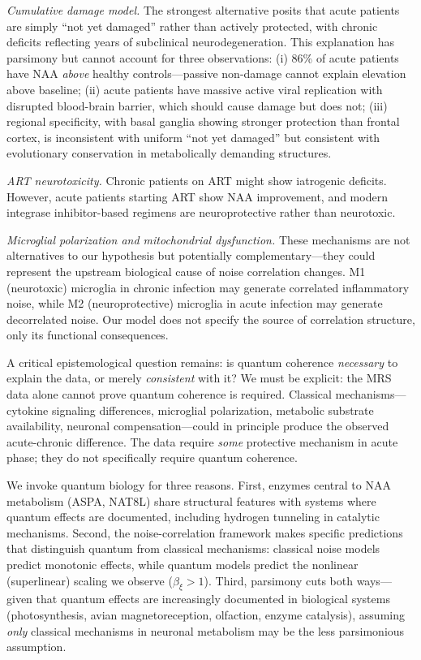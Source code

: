 \documentclass[10pt,a4paper]{article}
\begin{document}
\textit{Cumulative damage model.} The strongest alternative posits that acute patients are simply ``not yet damaged'' rather than actively protected, with chronic deficits reflecting years of subclinical neurodegeneration. This explanation has parsimony but cannot account for three observations: (i) 86\% of acute patients have NAA \textit{above} healthy controls---passive non-damage cannot explain elevation above baseline; (ii) acute patients have massive active viral replication with disrupted blood-brain barrier, which should cause damage but does not; (iii) regional specificity, with basal ganglia showing stronger protection than frontal cortex, is inconsistent with uniform ``not yet damaged'' but consistent with evolutionary conservation in metabolically demanding structures.

\textit{ART neurotoxicity.} Chronic patients on ART might show iatrogenic deficits. However, acute patients starting ART show NAA improvement, and modern integrase inhibitor-based regimens are neuroprotective rather than neurotoxic.

\textit{Microglial polarization and mitochondrial dysfunction.} These mechanisms are not alternatives to our hypothesis but potentially complementary---they could represent the upstream biological cause of noise correlation changes. M1 (neurotoxic) microglia in chronic infection may generate correlated inflammatory noise, while M2 (neuroprotective) microglia in acute infection may generate decorrelated noise. Our model does not specify the source of correlation structure, only its functional consequences.

A critical epistemological question remains: is quantum coherence \textit{necessary} to explain the data, or merely \textit{consistent} with it? We must be explicit: the MRS data alone cannot prove quantum coherence is required. Classical mechanisms---cytokine signaling differences, microglial polarization, metabolic substrate availability, neuronal compensation---could in principle produce the observed acute-chronic difference. The data require \textit{some} protective mechanism in acute phase; they do not specifically require quantum coherence.

We invoke quantum biology for three reasons. First, enzymes central to NAA metabolism (ASPA, NAT8L) share structural features with systems where quantum effects are documented, including hydrogen tunneling in catalytic mechanisms. Second, the noise-correlation framework makes specific predictions that distinguish quantum from classical mechanisms: classical noise models predict monotonic effects, while quantum models predict the nonlinear (superlinear) scaling we observe ($\beta_\xi > 1$). Third, parsimony cuts both ways---given that quantum effects are increasingly documented in biological systems (photosynthesis, avian magnetoreception, olfaction, enzyme catalysis), assuming \textit{only} classical mechanisms in neuronal metabolism may be the less parsimonious assumption.
\end{document}
